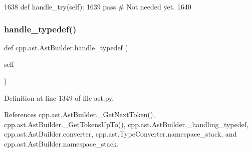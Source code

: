 \begin{DoxyCode}
1638     \textcolor{keyword}{def }handle\_try(self):
1639         \textcolor{keywordflow}{pass}  \textcolor{comment}{# Not needed yet.}
1640 
\end{DoxyCode}
\mbox{\label{classcpp_1_1ast_1_1AstBuilder_a808eb3d955ca2e3a957abb35dc577c66}} 
\subsubsection{\texorpdfstring{handle\+\_\+typedef()}{handle\_typedef()}}
{\footnotesize\ttfamily def cpp.\+ast.\+Ast\+Builder.\+handle\+\_\+typedef (\begin{DoxyParamCaption}\item[{}]{self }\end{DoxyParamCaption})}



Definition at line 1349 of file ast.\+py.



References cpp.\+ast.\+Ast\+Builder.\+\_\+\+Get\+Next\+Token(), cpp.\+ast.\+Ast\+Builder.\+\_\+\+Get\+Tokens\+Up\+To(), cpp.\+ast.\+Ast\+Builder.\+\_\+handling\+\_\+typedef, cpp.\+ast.\+Ast\+Builder.\+converter, cpp.\+ast.\+Type\+Converter.\+namespace\+\_\+stack, and cpp.\+ast.\+Ast\+Builder.\+namespace\+\_\+stack.


